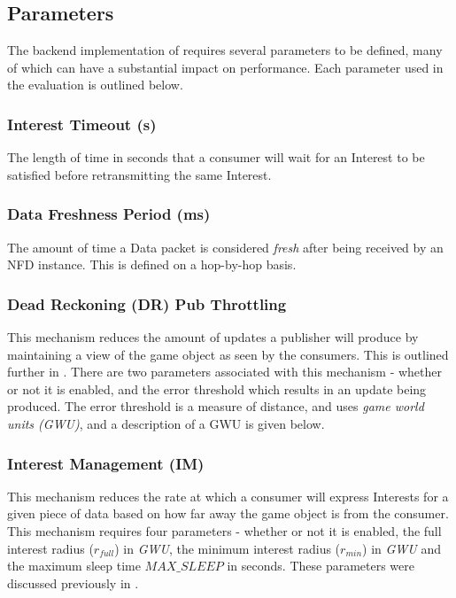 \subsection{Parameters}
The backend implementation of \game{} requires several parameters to be defined, many of which can have a substantial impact on performance. Each parameter used in the evaluation is outlined below.

\subsubsection*{Interest Timeout (s)}
The length of time in seconds that a consumer will wait for an Interest to be satisfied before retransmitting the same Interest.

\subsubsection*{Data Freshness Period (ms)}
The amount of time a Data packet is considered \textit{fresh} after being received by an NFD instance. This is defined on a hop-by-hop basis.

\subsubsection*{Dead Reckoning (DR) Pub Throttling}
This mechanism reduces the amount of updates a publisher will produce by maintaining a view of the game object as seen by the consumers. This is outlined further in . There are two parameters associated with this mechanism - whether or not it is enabled, and the error threshold which results in an update being produced. The error threshold is a measure of distance, and uses \textit{game world units (GWU)}, and a description of a GWU is given below.


\subsubsection*{Interest Management (IM)}
This mechanism reduces the rate at which a consumer will express Interests for a given piece of data based on how far away the game object is from the consumer. This mechanism requires four parameters - whether or not it is enabled, the full interest radius ($r_{full}$) in \textit{GWU}, the minimum interest radius ($r_{min}$) in \textit{GWU} and the maximum sleep time $MAX\_SLEEP$ in seconds. These parameters were discussed previously in . 

